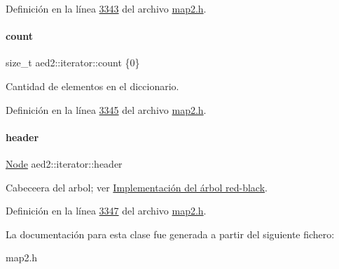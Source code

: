 Definición en la línea \hyperlink{map2_8h_source_l03343}{3343} del archivo \hyperlink{map2_8h_source}{map2.\+h}.

\mbox{\label{classaed2_1_1iterator_aff9ce2dda625c35bf8fb834bd5d3ba31_aff9ce2dda625c35bf8fb834bd5d3ba31}} 
\paragraph{\texorpdfstring{count}{count}}
{\footnotesize\ttfamily size\+\_\+t aed2\+::iterator\+::count \{0\}\hspace{0.3cm}{\ttfamily [private]}}



Cantidad de elementos en el diccionario. 



Definición en la línea \hyperlink{map2_8h_source_l03345}{3345} del archivo \hyperlink{map2_8h_source}{map2.\+h}.

\mbox{\label{classaed2_1_1iterator_a19db18e2e77583eb1fa819e854ff9c71_a19db18e2e77583eb1fa819e854ff9c71}} 
\paragraph{\texorpdfstring{header}{header}}
{\footnotesize\ttfamily \hyperlink{structaed2_1_1iterator_1_1Node}{Node} aed2\+::iterator\+::header\hspace{0.3cm}{\ttfamily [private]}}



Cabeceera del arbol; ver \hyperlink{Implementacion}{Implementación del árbol red-\/black}. 



Definición en la línea \hyperlink{map2_8h_source_l03347}{3347} del archivo \hyperlink{map2_8h_source}{map2.\+h}.



La documentación para esta clase fue generada a partir del siguiente fichero\+:\begin{DoxyCompactItemize}
\item 
map2.\+h\end{DoxyCompactItemize}

